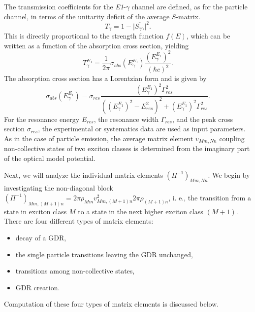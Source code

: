 \documentclass[twocolumn,amsmath,amssymb,10pt,groupedaddress,a4paper]{revtex4}
\begin{document}
The transmission coefficients for the \emph{E1}-$\gamma$ channel
are defined, as for the particle channel, in terms of the unitarity
deficit of the average $S$-matrix. \begin{equation}
T_{\gamma}=1-\Big|\overline{S_{\gamma\gamma}}\Big|^{2}.\end{equation}
This is directly proportional to the strength function $f(E)$, which
can be written as a function of the absorption cross section, yielding
\begin{equation}
T_{\gamma}^{E_{1}}=\frac{1}{2\pi}\sigma_{abs}(E_{\gamma}^{E_{1}})\frac{(E_{\gamma}^{E_{1}})^{2}}{(\hbar c)^{2}}.\end{equation}
The absorption cross section has a Lorentzian form and is given by
\begin{equation}
\sigma_{abs}(E_{\gamma}^{E_{1}})=\sigma_{res}\frac{(E_{\gamma}^{E_{1}})^{2}\Gamma_{res}^{2}}{((E_{\gamma}^{E_{1}})^{2}-E_{res}^{2})^{2}+(E_{\gamma}^{E_{1}})^{2}\Gamma_{res}^{2}}.\end{equation}
For the resonance energy $E_{res}$, the resonance width $\Gamma_{res}$,
and the peak cross section $\sigma_{res}$, the experimental or systematics
data are used as input parameters. As in the case of particle emission,
the average matrix element $v_{Mm,Nn}$ coupling non-collective states
of two exciton classes is determined from the imaginary part of the
optical model potential.

Next, we will analyze the individual matrix elements $(\Pi^{-1})_{Mm,Nn}$.
We begin by investigating the non-diagonal block $(\Pi^{-1})_{Mm,(M+1)n}=2\pi\rho_{Mm}v_{Mm,(M+1)n}^{2}2\pi\rho_{(M+1)n}$,
i. e., the transition from a state in exciton class $M$ to a state
in the next higher exciton class $(M+1)$. There are four different
types of matrix elements:

\begin{itemize}
\item decay of a GDR,
\item the single particle transitions leaving the GDR unchanged,
\item transitions among non-collective states,
\item GDR creation.
\end{itemize}
Computation of these four types of matrix elements is discussed below.
\end{document}
